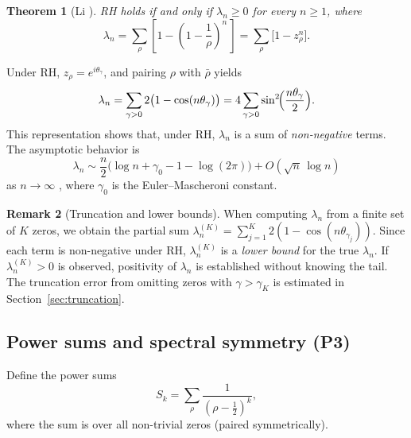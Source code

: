 \documentclass[11pt,a4paper]{article}
\newtheorem{theorem}{Theorem}[section]
\theoremstyle{definition}
\newtheorem{remark}[theorem]{Remark}
\begin{document}
\begin{theorem}[Li \cite{Li1997}]\label{thm:li}
RH holds if and only if $\lambda_n \geq 0$ for every $n \geq 1$, where
\begin{equation}\label{eq:li-def}
  \lambda_n = \sum_\rho \left[ 1 - \left(1 - \frac{1}{\rho}\right)^{\!n}\, \right]
  = \sum_\rho \bigl[1 - z_\rho^n\bigr].
\end{equation}
\end{theorem}

Under RH, $z_\rho = e^{i\theta_\gamma}$, and pairing $\rho$ with $\bar{\rho}$ yields
\begin{equation}\label{eq:li-trig}
  \lambda_n = \sum_{\gamma > 0} 2\bigl(1 - \cos(n\theta_\gamma)\bigr) 
  = 4 \sum_{\gamma > 0} \sin^2\!\Bigl(\frac{n\theta_\gamma}{2}\Bigr).
\end{equation}
This representation shows that, under RH, $\lambda_n$ is a sum of \emph{non-negative} terms. The asymptotic behavior is
\begin{equation}\label{eq:li-asymp}
  \lambda_n \sim \frac{n}{2}\bigl(\log n + \gamma_0 - 1 - \log(2\pi)\bigr) + O(\sqrt{n}\,\log n)
\end{equation}
as $n \to \infty$ \cite{BombieriLagarias1999,Coffey2005}, where $\gamma_0$ is the Euler--Mascheroni constant.

\begin{remark}[Truncation and lower bounds]\label{rem:truncation}
When computing $\lambda_n$ from a finite set of $K$ zeros, we obtain the partial sum $\lambda_n^{(K)} = \sum_{j=1}^{K} 2(1 - \cos(n\theta_{\gamma_j}))$. Since each term is non-negative under RH, $\lambda_n^{(K)}$ is a \emph{lower bound} for the true $\lambda_n$. If $\lambda_n^{(K)} > 0$ is observed, positivity of $\lambda_n$ is established without knowing the tail. The truncation error from omitting zeros with $\gamma > \gamma_K$ is estimated in Section~\ref{sec:truncation}.
\end{remark}

\subsection{Power sums and spectral symmetry (P3)}

Define the power sums
\begin{equation}\label{eq:sk-def}
  S_k = \sum_\rho \frac{1}{(\rho - \tfrac{1}{2})^k},
\end{equation}
where the sum is over all non-trivial zeros (paired symmetrically).
\end{document}

